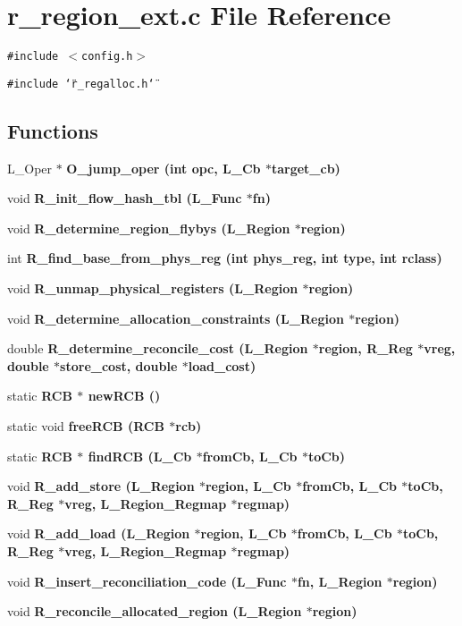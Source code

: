 \section{r\_\-region\_\-ext.c File Reference}
\label{r__region__ext_8c}
{\tt \#include $<$config.h$>$}\par
{\tt \#include \char`\"{}r\_\-regalloc.h\char`\"{}}\par
\subsection*{Functions}
\begin{CompactItemize}
\item 
L\_\-Oper $\ast$ \bf{O\_\-jump\_\-oper} (int opc, L\_\-Cb $\ast$target\_\-cb)
\item 
void \bf{R\_\-init\_\-flow\_\-hash\_\-tbl} (L\_\-Func $\ast$fn)
\item 
void \bf{R\_\-determine\_\-region\_\-flybys} (L\_\-Region $\ast$\bf{region})
\item 
int \bf{R\_\-find\_\-base\_\-from\_\-phys\_\-reg} (int phys\_\-reg, int type, int rclass)
\item 
void \bf{R\_\-unmap\_\-physical\_\-registers} (L\_\-Region $\ast$\bf{region})
\item 
void \bf{R\_\-determine\_\-allocation\_\-constraints} (L\_\-Region $\ast$\bf{region})
\item 
double \bf{R\_\-determine\_\-reconcile\_\-cost} (L\_\-Region $\ast$\bf{region}, \bf{R\_\-Reg} $\ast$vreg, double $\ast$store\_\-cost, double $\ast$load\_\-cost)
\item 
static \bf{RCB} $\ast$ \bf{new\-RCB} ()
\item 
static void \bf{free\-RCB} (\bf{RCB} $\ast$rcb)
\item 
static \bf{RCB} $\ast$ \bf{find\-RCB} (L\_\-Cb $\ast$from\-Cb, L\_\-Cb $\ast$to\-Cb)
\item 
void \bf{R\_\-add\_\-store} (L\_\-Region $\ast$\bf{region}, L\_\-Cb $\ast$from\-Cb, L\_\-Cb $\ast$to\-Cb, \bf{R\_\-Reg} $\ast$vreg, L\_\-Region\_\-Regmap $\ast$regmap)
\item 
void \bf{R\_\-add\_\-load} (L\_\-Region $\ast$\bf{region}, L\_\-Cb $\ast$from\-Cb, L\_\-Cb $\ast$to\-Cb, \bf{R\_\-Reg} $\ast$vreg, L\_\-Region\_\-Regmap $\ast$regmap)
\item 
void \bf{R\_\-insert\_\-reconciliation\_\-code} (L\_\-Func $\ast$fn, L\_\-Region $\ast$\bf{region})
\item 
void \bf{R\_\-reconcile\_\-allocated\_\-region} (L\_\-Region $\ast$\bf{region})

\end{CompactItemize}
